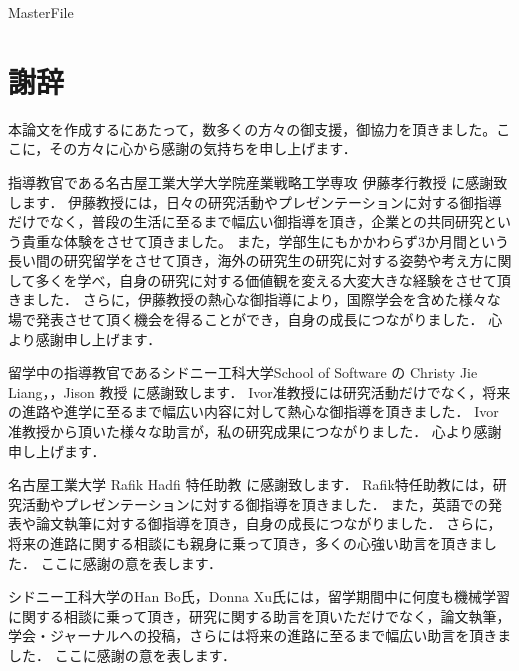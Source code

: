 \expandafter\ifx\csname MasterFile\endcsname\relax
\def\SubFile{hoge}


\fi
\cleardoublepage
\chapter*{謝辞}

本論文を作成するにあたって，数多くの方々の御支援，御協力を頂きました。ここに，その方々に心から感謝の気持ちを申し上げます． \par
\vspace{0.5cm}

指導教官である名古屋工業大学大学院産業戦略工学専攻 伊藤孝行教授 に感謝致します．
伊藤教授には，日々の研究活動やプレゼンテーションに対する御指導だけでなく，普段の生活に至るまで幅広い御指導を頂き，企業との共同研究という貴重な体験をさせて頂きました。
また，学部生にもかかわらず3か月間という長い間の研究留学をさせて頂き，海外の研究生の研究に対する姿勢や考え方に関して多くを学べ，自身の研究に対する価値観を変える大変大きな経験をさせて頂きました．
さらに，伊藤教授の熱心な御指導により，国際学会を含めた様々な場で発表させて頂く機会を得ることができ，自身の成長につながりました．
心より感謝申し上げます． \par
\vspace{0.5cm}

留学中の指導教官であるシドニー工科大学School of Software の  Christy  Jie Liang，，Jison 教授 に感謝致します．
Ivor准教授には研究活動だけでなく，将来の進路や進学に至るまで幅広い内容に対して熱心な御指導を頂きました．
Ivor准教授から頂いた様々な助言が，私の研究成果につながりました．
心より感謝申し上げます． \par
\vspace{0.5cm}

名古屋工業大学 Rafik Hadfi 特任助教 に感謝致します．
Rafik特任助教には，研究活動やプレゼンテーションに対する御指導を頂きました．
また，英語での発表や論文執筆に対する御指導を頂き，自身の成長につながりました．
さらに，将来の進路に関する相談にも親身に乗って頂き，多くの心強い助言を頂きました．
ここに感謝の意を表します． \par
\vspace{0.5cm}

シドニー工科大学のHan Bo氏，Donna Xu氏には，留学期間中に何度も機械学習に関する相談に乗って頂き，研究に関する助言を頂いただけでなく，論文執筆，学会・ジャーナルへの投稿，さらには将来の進路に至るまで幅広い助言を頂きました．
ここに感謝の意を表します． \par
\vspace{0.5cm}

